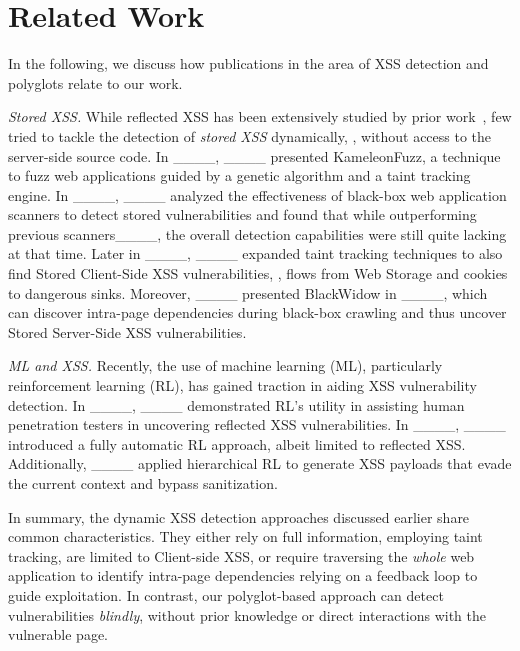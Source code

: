 \section{Related Work}
\label{sec:related-work}%
In the following, we discuss how publications in the area of XSS detection and polyglots relate to our work.

\smallskip\textit{Stored XSS.}
While reflected XSS has been extensively studied by prior work~\cite[\eg][]{LekStoJoh13, StoPfiKaiLek+15, stock2017web, MelDasShaBau+18, BenKleBarJoh21, KleBarBen+22, son2013postman, steffens2020pmforce}, few tried to tackle the detection of \emph{stored XSS} dynamically, \ie, without access to the server-side source code.
In ____, ____ presented KameleonFuzz, a technique to fuzz web applications guided by a genetic algorithm and a taint tracking engine.
In ____, ____ analyzed the effectiveness of black-box web application scanners to detect stored vulnerabilities and found that while outperforming previous scanners____, the overall detection capabilities were still quite lacking at that time.
Later in ____, ____ expanded taint tracking techniques to also find Stored Client-Side XSS vulnerabilities, \ie, flows from Web Storage and cookies to dangerous sinks.
Moreover, ____ presented BlackWidow in ____, which can discover intra-page dependencies during black-box crawling and thus uncover Stored Server-Side XSS vulnerabilities.

\textit{ML and XSS\@.}
Recently, the use of machine learning (ML), particularly reinforcement learning (RL), has gained traction in aiding XSS vulnerability detection.
In ____, ____ demonstrated RL's utility in assisting human penetration testers in uncovering reflected XSS vulnerabilities. 
In ____, ____ introduced a fully automatic RL approach, albeit limited to reflected XSS\@. 
Additionally, ____ applied hierarchical RL to generate XSS payloads that evade the current context and bypass sanitization.


In summary, the dynamic XSS detection approaches discussed earlier share common characteristics.
They either rely on full information, employing taint tracking, are limited to Client-side XSS, or require traversing the \emph{whole} web application to identify intra-page dependencies relying on a feedback loop to guide exploitation.
In contrast, our polyglot-based approach can detect vulnerabilities \emph{blindly}, without prior knowledge or direct interactions with the vulnerable page.

